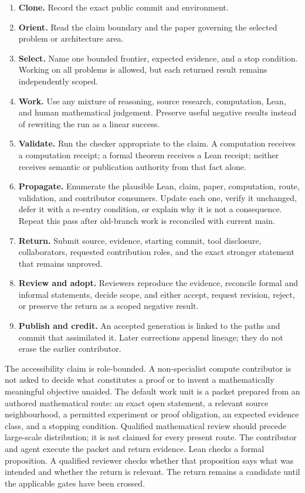 \documentclass[10pt]{article}
\begin{document}
\begin{enumerate}
\item \textbf{Clone.}  Record the exact public commit and environment.
\item \textbf{Orient.}  Read the claim boundary and the paper governing the
      selected problem or architecture area.
\item \textbf{Select.}  Name one bounded frontier, expected evidence, and a
      stop condition.  Working on all problems is allowed, but each returned
      result remains independently scoped.
\item \textbf{Work.}  Use any mixture of reasoning, source research,
      computation, Lean, and human mathematical judgement.  Preserve useful
      negative results instead of rewriting the run as a linear success.
\item \textbf{Validate.}  Run the checker appropriate to the claim.  A
      computation receives a computation receipt; a formal theorem receives a
      Lean receipt; neither receives semantic or publication authority from
      that fact alone.
\item \textbf{Propagate.}  Enumerate the plausible Lean, claim, paper,
      computation, route, validation, and contributor consumers.  Update each
      one, verify it unchanged, defer it with a re-entry condition, or explain
      why it is not a consequence.  Repeat this pass after old-branch work is
      reconciled with current main.
\item \textbf{Return.}  Submit source, evidence, starting commit, tool
      disclosure, collaborators, requested contribution roles, and the exact
      stronger statement that remains unproved.
\item \textbf{Review and adopt.}  Reviewers reproduce the evidence, reconcile
      formal and informal statements, decide scope, and either accept, request
      revision, reject, or preserve the return as a scoped negative result.
\item \textbf{Publish and credit.}  An accepted generation is linked to the
      paths and commit that assimilated it.  Later corrections append lineage;
      they do not erase the earlier contributor.
\end{enumerate}

The accessibility claim is role-bounded.  A non-specialist compute
contributor is not asked to decide what constitutes a proof or to invent a
mathematically meaningful objective unaided.  The default work unit is a
packet prepared from an authored mathematical route: an exact open statement,
a relevant source neighbourhood, a permitted
experiment or proof obligation, an expected evidence class, and a stopping
condition.  Qualified mathematical review should precede large-scale
distribution; it is not claimed for every present route.  The contributor and
agent execute the packet and return evidence.
Lean checks a formal proposition.  A qualified reviewer checks whether that
proposition says what was intended and whether the return is relevant.  The
return remains a candidate until the applicable gates have been crossed.
\end{document}
